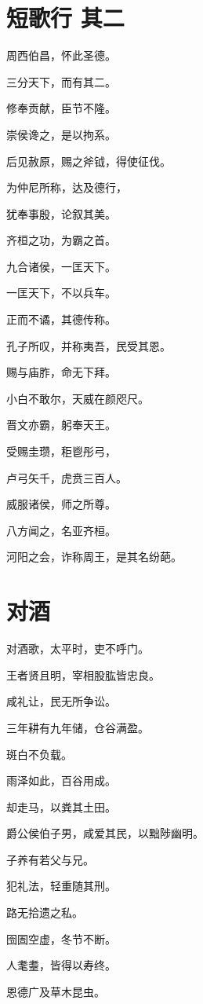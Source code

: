\documentclass[12pt,a4paper]{ctexbook}
\begin{document}
\section{短歌行 其二}
周西伯昌，怀此圣德。\par
三分天下，而有其二。\par
修奉贡献，臣节不隆。\par
崇侯谗之，是以拘系。\par
后见赦原，赐之斧钺，得使征伐。\par
为仲尼所称，达及德行，\par
犹奉事殷，论叙其美。\par
齐桓之功，为霸之首。\par
九合诸侯，一匡天下。\par
一匡天下，不以兵车。\par
正而不谲，其德传称。\par
孔子所叹，并称夷吾，民受其恩。\par
赐与庙胙，命无下拜。\par
小白不敢尔，天威在颜咫尺。\par
晋文亦霸，躬奉天王。\par
受赐圭瓒，秬鬯彤弓，\par
卢弓矢千，虎贲三百人。\par
威服诸侯，师之所尊。\par
八方闻之，名亚齐桓。\par
河阳之会，诈称周王，是其名纷葩。\par

\section{对酒}
对酒歌，太平时，吏不呼门。\par
王者贤且明，宰相股肱皆忠良。\par
咸礼让，民无所争讼。\par
三年耕有九年储，仓谷满盈。\par
斑白不负载。\par
雨泽如此，百谷用成。\par
却走马，以粪其土田。\par
爵公侯伯子男，咸爱其民，以黜陟幽明。\par
子养有若父与兄。\par
犯礼法，轻重随其刑。\par
路无拾遗之私。\par
囹圄空虚，冬节不断。\par
人耄耋，皆得以寿终。\par
恩德广及草木昆虫。\par
\end{document}

